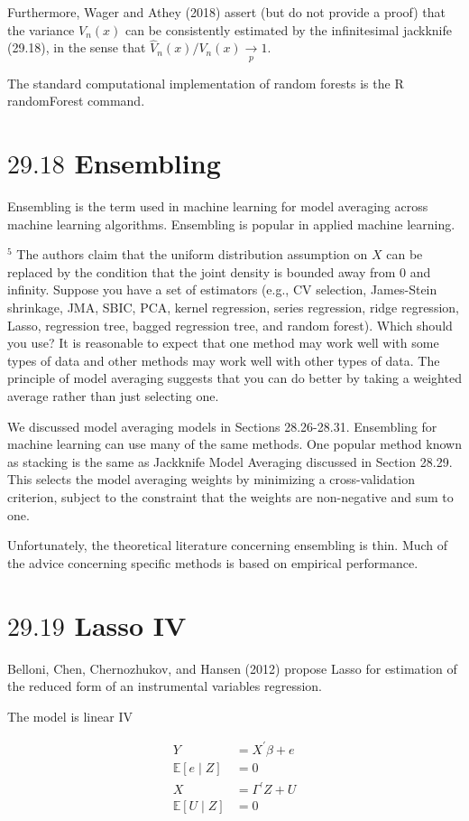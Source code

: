\documentclass[10pt]{article}
\begin{document}
Furthermore, Wager and Athey (2018) assert (but do not provide a proof) that the variance $V_{n}(x)$ can be consistently estimated by the infinitesimal jackknife (29.18), in the sense that $\widehat{V}_{n}(x) / V_{n}(x) \underset{p}{\longrightarrow} 1$.

The standard computational implementation of random forests is the R randomForest command.

\section{$29.18$ Ensembling}
Ensembling is the term used in machine learning for model averaging across machine learning algorithms. Ensembling is popular in applied machine learning.

${ }^{5}$ The authors claim that the uniform distribution assumption on $X$ can be replaced by the condition that the joint density is bounded away from 0 and infinity. Suppose you have a set of estimators (e.g., CV selection, James-Stein shrinkage, JMA, SBIC, PCA, kernel regression, series regression, ridge regression, Lasso, regression tree, bagged regression tree, and random forest). Which should you use? It is reasonable to expect that one method may work well with some types of data and other methods may work well with other types of data. The principle of model averaging suggests that you can do better by taking a weighted average rather than just selecting one.

We discussed model averaging models in Sections 28.26-28.31. Ensembling for machine learning can use many of the same methods. One popular method known as stacking is the same as Jackknife Model Averaging discussed in Section 28.29. This selects the model averaging weights by minimizing a cross-validation criterion, subject to the constraint that the weights are non-negative and sum to one.

Unfortunately, the theoretical literature concerning ensembling is thin. Much of the advice concerning specific methods is based on empirical performance.

\section{$29.19$ Lasso IV}
Belloni, Chen, Chernozhukov, and Hansen (2012) propose Lasso for estimation of the reduced form of an instrumental variables regression.

The model is linear IV

$$
\begin{aligned}
Y &=X^{\prime} \beta+e \\
\mathbb{E}[e \mid Z] &=0 \\
X &=\Gamma^{\prime} Z+U \\
\mathbb{E}[U \mid Z] &=0
\end{aligned}
$$
\end{document}
